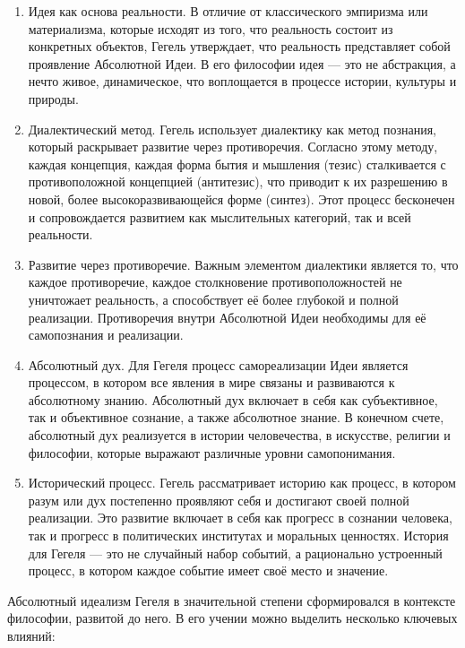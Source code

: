 \documentclass[12pt,a4paper]{article}
\begin{document}
	\begin{enumerate}
		\item Идея как основа реальности. В отличие от классического эмпиризма или материализма, которые исходят из того, что реальность состоит из конкретных объектов, Гегель утверждает, что реальность представляет собой проявление Абсолютной Идеи. В его философии идея — это не абстракция, а нечто живое, динамическое, что воплощается в процессе истории, культуры и природы.
		
		\item Диалектический метод. Гегель использует диалектику как метод познания, который раскрывает развитие через противоречия. Согласно этому методу, каждая концепция, каждая форма бытия и мышления (тезис) сталкивается с противоположной концепцией (антитезис), что приводит к их разрешению в новой, более высокоразвивающейся форме (синтез). Этот процесс бесконечен и сопровождается развитием как мыслительных категорий, так и всей реальности.
		
		\item Развитие через противоречие. Важным элементом диалектики является то, что каждое противоречие, каждое столкновение противоположностей не уничтожает реальность, а способствует её более глубокой и полной реализации. Противоречия внутри Абсолютной Идеи необходимы для её самопознания и реализации.
		
		\item Абсолютный дух. Для Гегеля процесс самореализации Идеи является процессом, в котором все явления в мире связаны и развиваются к абсолютному знанию. Абсолютный дух включает в себя как субъективное, так и объективное сознание, а также абсолютное знание. В конечном счете, абсолютный дух реализуется в истории человечества, в искусстве, религии и философии, которые выражают различные уровни самопонимания.
		
		\item Исторический процесс. Гегель рассматривает историю как процесс, в котором разум или дух постепенно проявляют себя и достигают своей полной реализации. Это развитие включает в себя как прогресс в сознании человека, так и прогресс в политических институтах и моральных ценностях. История для Гегеля — это не случайный набор событий, а рационально устроенный процесс, в котором каждое событие имеет своё место и значение.
	\end{enumerate}
	
	Абсолютный идеализм Гегеля в значительной степени сформировался в контексте философии, развитой до него. В его учении можно выделить несколько ключевых влияний:
	
\end{document}
